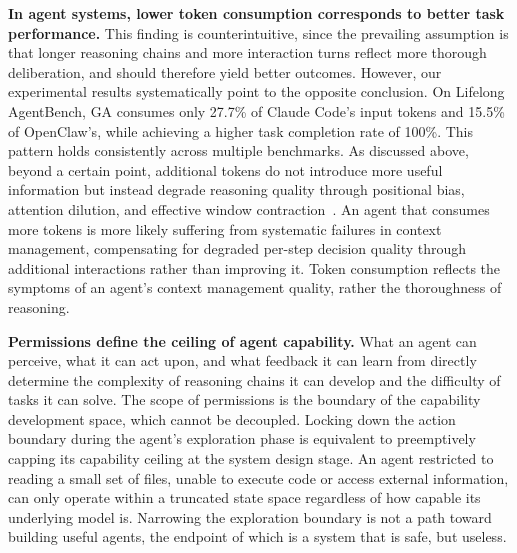 \textbf{In agent systems, lower token consumption corresponds to better 
task performance.} This finding is counterintuitive, since the prevailing 
assumption is that longer reasoning chains and more interaction turns reflect 
more thorough deliberation, and should therefore yield better outcomes. 
However, our experimental results systematically point to the opposite 
conclusion. On Lifelong AgentBench, GA consumes only 
27.7\% of Claude Code's input tokens and 15.5\% of OpenClaw's, while 
achieving a higher task completion rate of 100\%. This pattern holds 
consistently across multiple benchmarks. As discussed above, beyond a 
certain point, additional tokens do not introduce more useful information 
but instead degrade reasoning quality through positional bias, attention 
dilution, and effective window contraction~\cite{lost_in_middle, 
multi_turn_lost, anthropic_context}. An agent that consumes more tokens is more likely suffering from systematic 
failures in context management, compensating for degraded per-step decision 
quality through additional interactions rather than improving it. Token consumption reflects the symptoms of an agent's 
context management quality, rather the thoroughness of reasoning.


\textbf{Permissions define the ceiling of agent capability.} What an agent 
can perceive, what it can act upon, and what feedback it can learn from 
directly determine the complexity of reasoning chains it can develop and 
the difficulty of tasks it can solve. The scope of permissions is the 
boundary of the capability development space, which cannot be decoupled. Locking down the action 
boundary during the agent's exploration phase is equivalent to preemptively 
capping its capability ceiling at the system design stage. An agent 
restricted to reading a small set of files, unable to execute code or 
access external information, can only operate within a truncated state 
space regardless of how capable its underlying model is. Narrowing the 
exploration boundary is not a path toward building useful agents, the 
endpoint of which is a system that is safe, but useless.